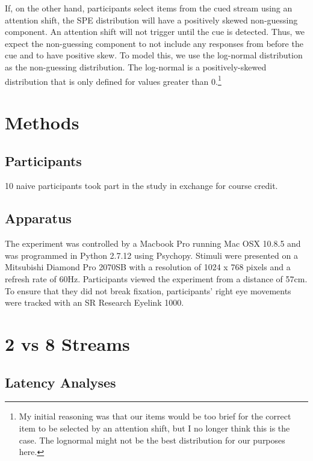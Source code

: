 \documentclass[,man]{apa6}
\let\rmarkdownfootnote\footnote%
\def\footnote{\protect\rmarkdownfootnote}
\theoremstyle{definition}
\theoremstyle{definition}
\theoremstyle{definition}
\theoremstyle{remark}
\begin{document}
If, on the other hand, participants select items from the cued stream
using an attention shift, the SPE distribution will have a positively
skewed non-guessing component. An attention shift will not trigger until
the cue is detected. Thus, we expect the non-guessing component to not
include any responses from before the cue and to have positive skew. To
model this, we use the log-normal distribution as the non-guessing
distribution. The log-normal is a positively-skewed distribution that is
only defined for values greater than 0.\footnote{My initial reasoning
  was that our items would be too brief for the correct item to be
  selected by an attention shift, but I no longer think this is the
  case. The lognormal might not be the best distribution for our
  purposes here.}

\section{Methods}\label{methods}

\subsection{Participants}\label{participants}

10 naive participants took part in the study in exchange for course
credit.

\subsection{Apparatus}\label{apparatus}

The experiment was controlled by a Macbook Pro running Mac OSX 10.8.5
and was programmed in Python 2.7.12 using Psychopy. Stimuli were
presented on a Mitsubishi Diamond Pro 2070SB with a resolution of 1024 x
768 pixels and a refresh rate of 60Hz. Participants viewed the
experiment from a distance of 57cm. To ensure that they did not break
fixation, participants' right eye movements were tracked with an SR
Research Eyelink 1000.

\section{2 vs 8 Streams}\label{vs-8-streams}

\subsection{Latency Analyses}\label{latency-analyses}
\end{document}
